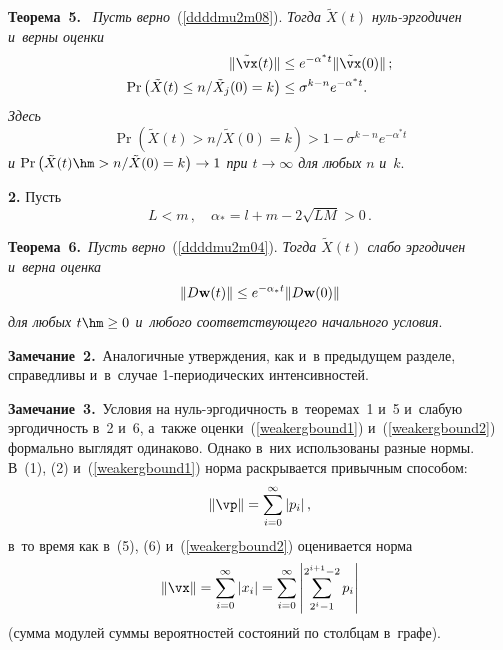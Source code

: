 \noindent
\textbf{Теорема~5.}\
 \textit{Пусть верно}~(\ref{ddddmu2m08}). \textit{Тогда
$\tilde{X}(t)$ нуль-эргодичен и~верны оценки}
\begin{align*}
\|\tilde{\vx}(t)\| &\le e^{ -\alpha^*  t} \|\tilde{\vx}(0)\|\,;
\\
\Pr \left( \tilde{X}(t)\leq n/\tilde{X}_j(0)=k\right) &\leq \sigma ^{k-n}
e^{-\alpha^*t}.
\end{align*}
\textit{Здесь}
\begin{equation*}
\Pr \left( \tilde{X}(t) > n/\tilde{X}(0)=k\right) >1 - \sigma ^{k-n}
e^{-\alpha^*t}  
\end{equation*}
\textit{и} $ \Pr \left( \tilde{X}(t)\hm >
n/\tilde{X}(0)=k\right) \to 1$  \textit{при $t \to \infty$  для  любых} $n$ \textit{и}~$k$.


\smallskip

{\bf 2.}  Пусть
\begin{equation}
L < m\,, \quad \alpha_*= l+m -2\sqrt{LM} > 0\,. 
\label{ddddmu2m04}
\end{equation}


\noindent
\textbf{Теорема~6.}\
\textit{Пусть верно}~(\ref{ddddmu2m04}). \textit{Тогда
$\tilde{X}(t)$ слабо эргодичен и~верна оценка}
\begin{equation}
\|D{\bf w}(t)\| \le e^{- \alpha_* t}\|D{\bf w}(0)\|
\label{weakergbound2}
\end{equation}
\textit{для любых $ t  \hm\ge 0$ и~любого соответствующего начального условия}.


\smallskip

\noindent
\textbf{Замечание~2.}\
Аналогичные утверждения, как и~в предыдущем разделе, справедливы и~в~случае 1-пе\-рио\-ди\-че\-ских интенсивностей.


\smallskip

\noindent
\textbf{Замечание~3.}\
 Условия на нуль-эр\-го\-дич\-ность в~теоремах~1 и~5 
 и~слабую эргодичность в~2 и~6, а~также оценки~(\ref{weakergbound1}) 
 и~(\ref{weakergbound2}) формально выглядят одинаково. Однако в~них  использованы разные нормы.
 В~(1),  (2) и~(\ref{weakergbound1})
  норма раскрывается привычным способом:  
  $$
  \|\vp\|  =    \sum\limits_{i=0}^{\infty}|p_i|\,,
  $$
   в~то время как в~(5), 
(6) и~(\ref{weakergbound2}) оценивается норма 
$$
\|\vx\|=    \sum\limits_{i=0}^{\infty}|x_i| = \sum\limits_{i=0}^{\infty}\left|\sum\limits_{2^i-1}^{2^{i+1}-2}
  p_i\right|
  $$ 
  (сумма модулей  суммы вероятностей состояний по столбцам в~графе).


